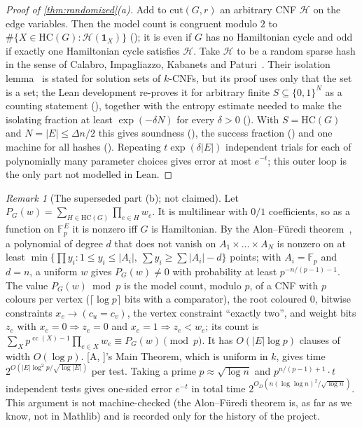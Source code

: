 \documentclass[11pt]{amsart}
\theoremstyle{plain}
\theoremstyle{definition}
\theoremstyle{remark}
\newtheorem{remark}[theorem]{Remark}
\numberwithin{equation}{section}
\newcommand{\F}{\mathbb{F}}
\newcommand{\cc}{\operatorname{cc}}
\newcommand{\A}[1][]{\textup{[A\if\relax\detokenize{#1}\relax\else, #1\fi]}}
\begin{document}
\begin{proof}[Proof of \cref{thm:randomized}\textup{(a)}]
Add to $\mathrm{cut}(G,r)$ an arbitrary CNF $\mathcal H$ on the edge variables. Then the model
count is congruent modulo $2$ to $\#\{X\in\mathrm{HC}(G):\mathcal H(\mathbf 1_X)\}$
(); it is even if $G$ has no Hamiltonian cycle and odd if
exactly one Hamiltonian cycle satisfies $\mathcal H$. Take $\mathcal H$ to be a random sparse hash
in the sense of Calabro, Impagliazzo, Kabanets and Paturi~\cite{CIKP08}. Their isolation lemma~\cite[Lemma~3]{CIKP08} is
stated for solution sets of $k$-CNFs, but its proof uses only that the set is a set; the Lean
development re-proves it for arbitrary finite $S\subseteq\{0,1\}^N$ as a counting statement
(), together with the entropy estimate needed to make the isolating
fraction at least $\exp(-\delta N)$ for every $\delta>0$ (). With
$S=\mathrm{HC}(G)$ and $N=|E|\le\Delta n/2$ this gives soundness (), the
success fraction () and one machine for all hashes
(). Repeating $t\exp(\delta|E|)$ independent trials for each of
polynomially many parameter choices gives error at most $e^{-t}$; this outer loop is the only
part not modelled in Lean.
\end{proof}

\begin{remark}[The superseded part (b); not claimed]\label{rem:randomized-b}
Let $P_G(w)=\sum_{H\in\mathrm{HC}(G)}\prod_{e\in H}w_e$. It is multilinear with $0/1$
coefficients, so as a function on $\F_p^E$ it is nonzero iff $G$ is Hamiltonian. By the
Alon--Füredi theorem~\cite{AlonFuredi93}, a polynomial of degree $d$ that does not vanish on
$A_1\times\dots\times A_N$ is nonzero on at least
$\min\{\prod y_i : 1\le y_i\le|A_i|,\ \sum y_i\ge\sum|A_i|-d\}$ points; with $A_i=\F_p$ and $d=n$,
a uniform $w$ gives $P_G(w)\ne0$ with probability at least $p^{-n/(p-1)-1}$. The value
$P_G(w)\bmod p$ is the model count, modulo $p$, of a CNF with $p$ colours per vertex
($\lceil\log p\rceil$ bits with a comparator), the root coloured $0$, bitwise constraints
$x_e\to(c_u=c_v)$, the vertex constraint ``exactly two'', and weight bits $z_e$ with
$x_e=0\Rightarrow z_e=0$ and $x_e=1\Rightarrow z_e<w_e$; its count is
$\sum_Xp^{\cc(X)-1}\prod_{e\in X}w_e\equiv P_G(w)\pmod p$. It has $O(|E|\log p)$ clauses of width
$O(\log p)$. \A's Main Theorem, which is uniform in $k$, gives time $2^{O(|E|\log^2p/\sqrt{\log
|E|})}$ per test. Taking a prime $p\approx\sqrt{\log n}$ and $p^{n/(p-1)+1}\cdot t$ independent
tests gives one-sided error $e^{-t}$ in total time $2^{O_D(n(\log\log n)^2/\sqrt{\log n})}$.
This argument is not machine-checked (the Alon--Füredi theorem is, as far as we know, not in
Mathlib) and is recorded only for the history of the project.
\end{remark}
\end{document}
